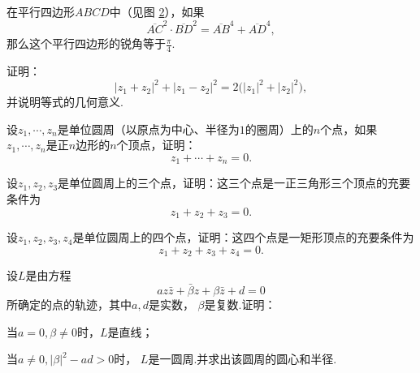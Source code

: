 \begin{xiti}
\begin{figure}[!ht]
 \begin{minipage}[b]{0.48\textwidth}
 \centering
   \caption{}\label{fig1.6}
 \end{minipage}
 \end{figure}
 \begin{figure}[!ht]
  \centering
  \caption{}\label{fig1.7}
 \end{figure}
 \item 在平行四边形$ABCD$中（见图 \ref{fig1.7}），如果
   \[\overline{AC}^2\cdot\overline{BD}^2=\overline{AB}^4+\overline{AD}^4,\]
 那么这个平行四边形的锐角等于$\frac\pi4$.
 \item 证明：
   \[|z_1+z_2|^2+|z_1-z_2|^2=2\big(|z_1|^2+|z_2|^2\big),\]
 并说明等式的几何意义.
 \item 设$z_1,\cdots,z_n$是单位圆周（以原点为中心、半径为$1$的圈周）上的$n$个点，如果$z_1,\cdots,z_n$是正$n$边形的$n$个顶点，证明：
     \[z_1+\cdots+z_n=0.\]
 \item 设$z_1,z_2,z_3$是单位圆周上的三个点，证明：这三个点是一正三角形三个顶点的充要条件为
     \[z_1+z_2+z_3=0.\]
 \item 设$z_1,z_2,z_3,z_4$是单位圆周上的四个点，证明：这四个点是一矩形顶点的充要条件为
     \[z_1+z_2+z_3+z_4=0.\]
 \item 设$L$是由方程\hypertarget{xiti1.2.14}{}
     \[az\bar z+\bar\beta z+\beta\bar z+d=0\]
 所确定的点的轨迹，其中$a,d$是实数， $\beta$是复数.证明：
   \begin{enuma}
     \item 当$a=0,\beta\ne0$时，$L$是直线；
     \item 当$a\ne0,|\beta|^2-ad>0$时， $L$是一圆周.并求出该圆周的圆心和半径.

\end{enuma}
\end{xiti}
